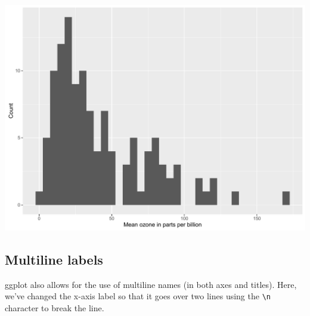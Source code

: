 \begin{Shaded}
\begin{Highlighting}[]
\StringTok{ }\NormalTok{(} \StringTok{ }
\StringTok{      }\NormalTok{(}\NormalTok{(}  \NormalTok{) +}
\StringTok{      }\NormalTok{(} \NormalTok{) +}
\StringTok{      }\NormalTok{(} \NormalTok{)}
\end{Highlighting}
\end{Shaded}

\begin{center}\includegraphics[width=0.55\linewidth]{figures/histogram_5-1} \end{center}

\subsection{Multiline labels}\label{multiline-labels}

ggplot also allows for the use of multiline names (in both axes and
titles). Here, we've changed the x-axis label so that it goes over two
lines using the \texttt{\textbackslash{}n} character to break the line.

\begin{Shaded}
\begin{Highlighting}[]
\StringTok{ }\NormalTok{(} \StringTok{ }
\StringTok{      }\NormalTok{(}\NormalTok{(}  \NormalTok{) +}
\StringTok{      }\NormalTok{(} \NormalTok{) +}
\StringTok{      }\NormalTok{(} \NormalTok{)}
\end{Highlighting}
\end{Shaded}

